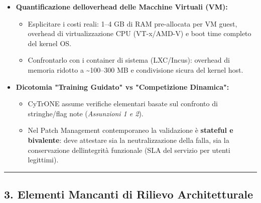 \begin{itemize}
\tightlist
\item
  \textbf{Quantificazione dell\textquotesingle overhead delle Macchine
  Virtuali (VM):}

  \begin{itemize}
  \tightlist
  \item
    Esplicitare i costi reali: 1--4 GB di RAM pre-allocata per VM guest,
    overhead di virtualizzazione CPU (VT-x/AMD-V) e boot time completo
    del kernel OS.
  \item
    Confrontarlo con i container di sistema (LXC/Incus): overhead di
    memoria ridotto a \textasciitilde100--300 MB e condivisione sicura
    del kernel host.
  \end{itemize}
\item
  \textbf{Dicotomia "Training Guidato" vs "Competizione Dinamica":}

  \begin{itemize}
  \tightlist
  \item
    CyTrONE assume verifiche elementari basate sul confronto di
    stringhe/flag note (\emph{Assunzioni 1 e 2}).
  \item
    Nel Patch Management contemporaneo la validazione è \textbf{stateful
    e bivalente}: deve attestare sia la neutralizzazione della falla,
    sia la conservazione dell\textquotesingle integrità funzionale (SLA
    del servizio per utenti legittimi).
  \end{itemize}
\end{itemize}

\begin{center}\rule{0.5\linewidth}{0.5pt}\end{center}

\subsection{3. Elementi Mancanti di Rilievo
Architetturale}\label{3-elementi-mancanti-di-rilievo-architetturale}

